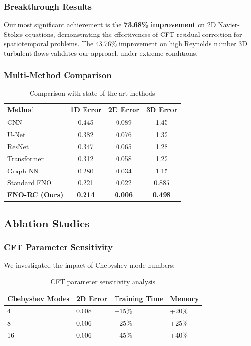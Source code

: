 \documentclass[11pt,twocolumn]{article}
\begin{document}
\subsubsection{Breakthrough Results}

Our most significant achievement is the \textbf{73.68\% improvement} on 2D Navier-Stokes equations, demonstrating the effectiveness of CFT residual correction for spatiotemporal problems. The 43.76\% improvement on high Reynolds number 3D turbulent flows validates our approach under extreme conditions.

\subsubsection{Multi-Method Comparison}

\begin{table}[h]
\centering
\caption{Comparison with state-of-the-art methods}
\label{tab:method_comparison}
\footnotesize
\begin{tabular}{@{}p{2.5cm}ccc@{}}
\toprule
\textbf{Method} & \textbf{1D Error} & \textbf{2D Error} & \textbf{3D Error} \\
\midrule
CNN & 0.445 & 0.089 & 1.45 \\
U-Net & 0.382 & 0.076 & 1.32 \\
ResNet & 0.347 & 0.065 & 1.28 \\
Transformer & 0.312 & 0.058 & 1.22 \\
Graph NN & 0.280 & 0.034 & 1.15 \\
Standard FNO & 0.221 & 0.022 & 0.885 \\
\textbf{FNO-RC (Ours)} & \textbf{0.214} & \textbf{0.006} & \textbf{0.498} \\
\bottomrule
\end{tabular}
\end{table}

\subsection{Ablation Studies}

\subsubsection{CFT Parameter Sensitivity}

We investigated the impact of Chebyshev mode numbers:

\begin{table}[h]
\centering
\caption{CFT parameter sensitivity analysis}
\label{tab:ablation}
\footnotesize
\begin{tabular}{@{}p{2cm}p{1.5cm}p{1.8cm}p{1.2cm}@{}}
\toprule
\textbf{Chebyshev Modes} & \textbf{2D Error} & \textbf{Training Time} & \textbf{Memory} \\
\midrule
4 & 0.008 & +15\% & +20\% \\
8 & 0.006 & +25\% & +25\% \\
16 & 0.006 & +45\% & +40\% \\
\bottomrule
\end{tabular}
\end{table}
\end{document}
